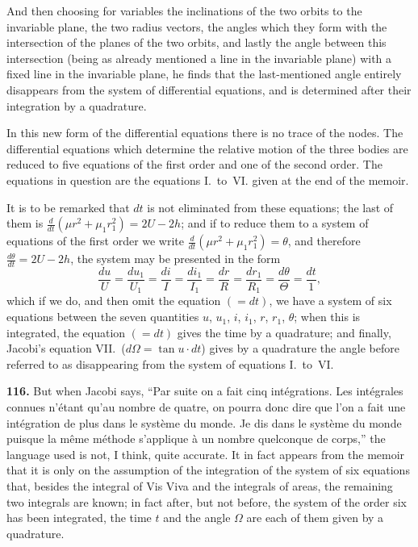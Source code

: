 \documentclass[11pt,a4paper]{book}
\begin{document}
And then choosing for variables the inclinations of the two orbits to the invariable plane, the two radius vectors, the angles which they form with the intersection of the planes of the two orbits, and lastly the angle between this intersection (being as already mentioned a line in the invariable plane) with a fixed line in the invariable plane, he finds that the last-mentioned angle entirely disappears from the system of differential equations, and is determined after their integration by a quadrature.

In this new form of the differential equations there is no trace of the nodes. The differential equations which determine the relative motion of the three bodies are reduced to five equations of the first order and one of the second order. The equations in question are the equations I.~to~VI. given at the end of the memoir.

It is to be remarked that $dt$ is not eliminated from these equations; the last of them is $\frac{d}{dt}(\mu r^2 + \mu_1 r_1^2) = 2U - 2h$; and if to reduce them to a system of equations of the first order we write $\frac{d}{dt}(\mu r^2 + \mu_1 r_1^2) = \theta$, and therefore $\frac{d\theta}{dt} = 2U - 2h$, the system may be presented in the form
\[
\frac{du}{U} = \frac{du_1}{U_1} = \frac{di}{I} = \frac{di_1}{I_1} = \frac{dr}{R} = \frac{dr_1}{R_1} = \frac{d\theta}{\Theta} = \frac{dt}{1},
\]
which if we do, and then omit the equation $(=dt)$, we have a system of six equations between the seven quantities $u$, $u_1$, $i$, $i_1$, $r$, $r_1$, $\theta$; when this is integrated, the equation $(=dt)$ gives the time by a quadrature; and finally, Jacobi's equation VII.\ ($d\Omega = \tan u \cdot dt$) gives by a quadrature the angle before referred to as disappearing from the system of equations I.~to~VI.

\textbf{116.} But when Jacobi says, ``Par suite on a fait cinq int\'egrations. Les int\'egrales connues n'\'etant qu'au nombre de quatre, on pourra donc dire que l'on a fait une int\'egration de plus dans le syst\`eme du monde. Je dis dans le syst\`eme du monde puisque la m\^eme m\'ethode s'applique \`a un nombre quelconque de corps,'' the language used is not, I think, quite accurate. It in fact appears from the memoir that it is only on the assumption of the integration of the system of six equations that, besides the integral of Vis Viva and the integrals of areas, the remaining two integrals are known; in fact after, but not before, the system of the order six has been integrated, the time $t$ and the angle $\Omega$ are each of them given by a quadrature.
\end{document}
